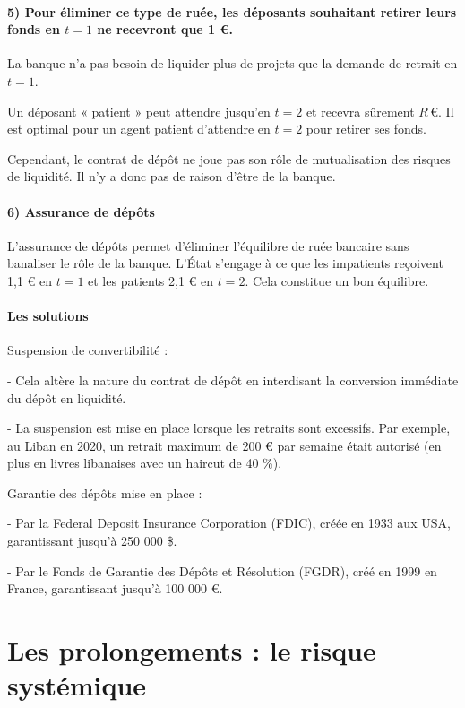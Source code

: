 \documentclass[a4paper, 12pt]{report}
\begin{document}
\paragraph{5) Pour éliminer ce type de ruée, les déposants souhaitant retirer leurs fonds en \( t=1 \) ne recevront que 1 €.}

La banque n’a pas besoin de liquider plus de projets que la demande de retrait en \( t=1 \).

Un déposant « patient » peut attendre jusqu’en \( t=2 \) et recevra sûrement \( R \, € \). Il est optimal pour un agent patient d’attendre en \( t=2 \) pour retirer ses fonds.

Cependant, le contrat de dépôt ne joue pas son rôle de mutualisation des risques de liquidité. Il n’y a donc pas de raison d’être de la banque.

\paragraph{6) Assurance de dépôts}

L'assurance de dépôts permet d'éliminer l'équilibre de ruée bancaire sans banaliser le rôle de la banque. L'État s’engage à ce que les impatients reçoivent 1,1 € en \( t=1 \) et les patients 2,1 € en \( t=2 \). Cela constitue un bon équilibre.

\paragraph{Les solutions}

Suspension de convertibilité :

- Cela altère la nature du contrat de dépôt en interdisant la conversion immédiate du dépôt en liquidité.

- La suspension est mise en place lorsque les retraits sont excessifs. Par exemple, au Liban en 2020, un retrait maximum de 200 € par semaine était autorisé (en plus en livres libanaises avec un haircut de 40 \%).

Garantie des dépôts mise en place :

- Par la Federal Deposit Insurance Corporation (FDIC), créée en 1933 aux USA, garantissant jusqu'à 250 000 \$.

- Par le Fonds de Garantie des Dépôts et Résolution (FGDR), créé en 1999 en France, garantissant jusqu'à 100 000 €.

\section{Les prolongements : le risque systémique}
\end{document}
